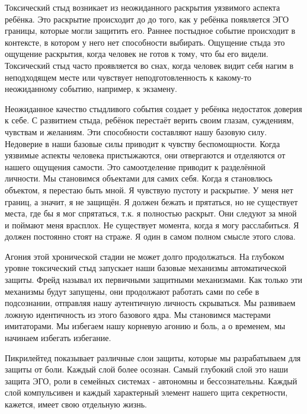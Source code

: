 \documentclass[10pt, fleqn]{article}
\begin{document}


Токсический стыд возникает из неожиданного раскрытия уязвимого аспекта ребёнка. Это раскрытие происходит до до того, как у ребёнка появляется ЭГО границы, которые могли защитить его. Раннее постыдное событие происходит в контексте, в котором у него нет способности выбирать. Ощущение стыда это ощущение раскрытия, когда человек не готов к тому, что бы его видели. Токсический стыд часто проявляется во снах, когда человек видит себя нагим в неподходящем месте или чувствует неподготовленность к какому-то неожиданному событию, например, к экзамену.

Неожиданное качество стыдливого события создает у ребёнка недостаток доверия к себе. С развитием стыда, ребёнок перестаёт верить своим глазам, суждениям, чувствам и желаниям. Эти способности составляют нашу базовую силу. Недоверие в наши базовые силы приводит к чувству беспомощности. Когда уязвимые аспекты человека пристыжаются, они отвергаются и отделяются от нашего ощущения самости. Это самоотделение приводит к разделённой личности. Мы становимся объектами для самих себя. Когда я становлюсь объектом, я перестаю быть мной. Я чувствую пустоту и раскрытие. У меня нет границ, а значит, я не защищён. Я должен бежать и прятаться, но не существует места, где бы я мог спрятаться, т.к. я полностью раскрыт. Они следуют за мной и поймают меня врасплох. Не существует момента, когда я могу расслабиться. Я должен постоянно стоят на страже. Я один в самом полном смысле этого слова.

Агония этой хронической стадии не может долго продолжаться. На глубоком уровне токсический стыд запускает наши базовые механизмы автоматической защиты. Фрейд называл их первичными защитными механизмами. Как только эти механизмы будут запущены, они продолжают работать сами по себе в подсознании, отправляя нашу аутентичную личность скрываться. Мы развиваем ложную идентичность из этого базового ядра. Мы становимся мастерами имитаторами. Мы избегаем нашу корневую агонию и боль, а о временем, мы начинаем избегать избегание.

Пикрилейтед показывает различные слои защиты, которые мы разрабатываем для защиты от боли. Каждый слой более осознан. Самый глубокий слой это наши защита ЭГО, роли в семейных системах - автономны и бессознательны. Каждый слой компульсивен и каждый характерный элемент нашего щита секретности, кажется, имеет свою отдельную жизнь.

\end{document}
